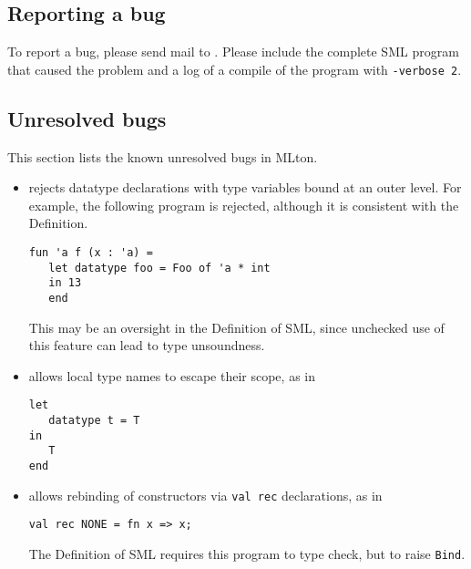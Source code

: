 %
\subsection{Reporting a bug}

To report a bug, please send mail to {\mltonmail}.  Please include the
complete SML program that caused the problem and a log of a compile of
the program with {\tt -verbose 2}.
%
\subsection{Unresolved bugs}

This section lists the known unresolved bugs in MLton.

\begin{itemize}

\item
{\mlton} rejects datatype declarations with type variables bound at
an outer level.  For example, the following program is rejected,
although it is consistent with the Definition.
\begin{verbatim}
fun 'a f (x : 'a) =
   let datatype foo = Foo of 'a * int
   in 13
   end
\end{verbatim}
This may be an oversight in the Definition of SML, since unchecked use
of this feature can lead to type unsoundness.

\item
{\mlton} allows local type names to escape their scope, as in
\begin{verbatim}
let
   datatype t = T
in
   T
end
\end{verbatim}

\item
{\mlton} allows rebinding of constructors via {\tt val rec}
declarations, as in
\begin{verbatim}
val rec NONE = fn x => x;
\end{verbatim}
The Definition of SML requires this program to type check, but to
raise {\tt Bind}.

\end{itemize}
